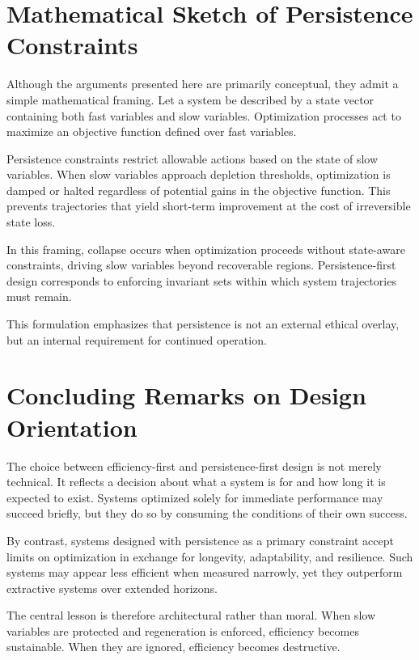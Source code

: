 \documentclass[12pt]{article} \usepackage[margin=1in]{geometry} \usepackage{setspace} \usepackage{amsmath,amssymb} \usepackage{hyperref}
\begin{document}
\section{Mathematical Sketch of Persistence Constraints}

Although the arguments presented here are primarily conceptual, they admit a simple mathematical framing. Let a system be described by a state vector containing both fast variables and slow variables. Optimization processes act to maximize an objective function defined over fast variables.

Persistence constraints restrict allowable actions based on the state of slow variables. When slow variables approach depletion thresholds, optimization is damped or halted regardless of potential gains in the objective function. This prevents trajectories that yield short-term improvement at the cost of irreversible state loss.

In this framing, collapse occurs when optimization proceeds without state-aware constraints, driving slow variables beyond recoverable regions. Persistence-first design corresponds to enforcing invariant sets within which system trajectories must remain.

This formulation emphasizes that persistence is not an external ethical overlay, but an internal requirement for continued operation.

\section{Concluding Remarks on Design Orientation}

The choice between efficiency-first and persistence-first design is not merely technical. It reflects a decision about what a system is for and how long it is expected to exist. Systems optimized solely for immediate performance may succeed briefly, but they do so by consuming the conditions of their own success.

By contrast, systems designed with persistence as a primary constraint accept limits on optimization in exchange for longevity, adaptability, and resilience. Such systems may appear less efficient when measured narrowly, yet they outperform extractive systems over extended horizons.

The central lesson is therefore architectural rather than moral. When slow variables are protected and regeneration is enforced, efficiency becomes sustainable. When they are ignored, efficiency becomes destructive.
\end{document}
